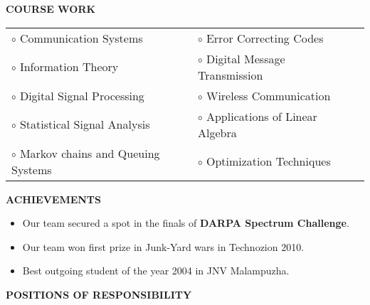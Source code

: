 \documentclass[a4paper,10pt]{article}
\begin{document}
 \colorbox{titleColor}{\parbox{6.5in}{\textbf{COURSE WORK}}}

 \begin{tabular}{p{3.5in}p{5in}p{3.5in}}
     $\circ$ Communication Systems		&$\circ$ Error Correcting Codes \\
    $\circ$ Information Theory			&$\circ$ Digital Message Transmission \\
    $\circ$ Digital Signal Processing		&$\circ$ Wireless Communication \\
    $\circ$ Statistical Signal Analysis	&$\circ$ Applications of Linear Algebra \\
    $\circ$ Markov chains and Queuing Systems	&$\circ$ Optimization Techniques \\
\end{tabular}

 \colorbox{titleColor}{\parbox{6.5in}{\textbf{ACHIEVEMENTS}}}

 \begin{itemize}
  \item Our team secured a spot in the finals of \textbf{DARPA Spectrum Challenge}.
  \item Our team won first prize in Junk-Yard wars in Technozion 2010.
  \item Best outgoing student of the year 2004 in JNV Malampuzha.
  \end{itemize}

 \colorbox{titleColor}{\parbox{6.5in}{\textbf{POSITIONS OF RESPONSIBILITY}}}
\end{document}
